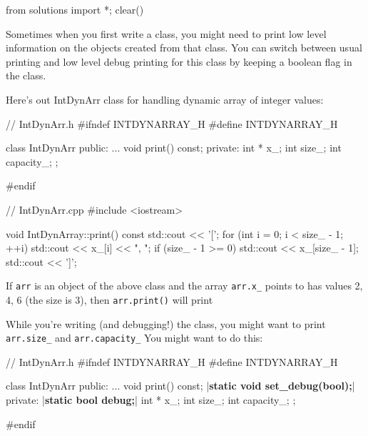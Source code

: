 \begin{python0}
from solutions import *; clear()
\end{python0}

Sometimes when you first write a class, you might need to print low
level information on the objects created from that class. You can switch
between usual printing and low level debug printing for this class by
keeping a boolean flag in the class.

Here's out IntDynArr class for handling dynamic array of
integer values:

\begin{consolethree}[escapeinside=||]
// IntDynArr.h
#ifndef INTDYNARRAY_H
#define INTDYNARRAY_H

class IntDynArr
{
public:
    ...
    void print() const;
private:
    int * x_;
    int size_;
    int capacity_;
};

#endif
\end{consolethree}

\begin{consolethree}[escapeinside=||]
// IntDynArr.cpp
#include <iostream>

void IntDynArray::print() const
{
    std::cout << '[';
    for (int i = 0; i < size_ - 1; ++i)
    {
        std::cout << x_[i] << ", ";
    }
    if (size_ - 1 >= 0)
    {
        std::cout << x_[size_ - 1];
    }
    std::cout << ']';
}
\end{consolethree}

If \texttt{arr} is an object of the above class and the array
\texttt{arr.x\_} points to has values 2, 4, 6 (the size is 3), then
\texttt{arr.print()} will print

\begin{consolethree}[escapeinside=||]
[2, 4, 6]
\end{consolethree}

While you're writing (and debugging!) the class, you
might want to print \texttt{arr.size\_} and \texttt{arr.capacity\_} You
might want to do this:

\begin{consolethree}[escapeinside=||]
// IntDynArr.h
#ifndef INTDYNARRAY_H
#define INTDYNARRAY_H

class IntDynArr
{
public:
    ...
    void print() const;
    |{\bf static void set\_debug(bool);}|
private:
    |{\bf static bool debug;}|
    int * x_;
    int size_;
    int capacity_;
};

#endif
\end{consolethree}

